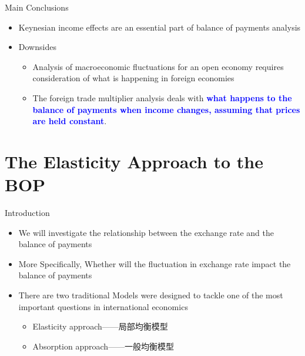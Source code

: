 \documentclass[10pt,hyperref={CJKbookmarks=true},xcolor=dvipsnames,aspectratio=169]{beamer}
\begin{document}
\begin{frame}{Main Conclusions}

\begin{itemize}
\item Keynesian income effects are an essential part of balance of payments
analysis
\item Downsides

\begin{itemize}
\item Analysis of macroeconomic fluctuations for an open economy requires
consideration of what is happening in foreign economies
\item The foreign trade multiplier analysis deals with \textbf{\textcolor{blue}{what
happens to the balance of payments when income changes, assuming that
prices are held constant}}.
\end{itemize}
\end{itemize}
\end{frame}



\section{The Elasticity Approach to the BOP}
\begin{frame}{Introduction}

\begin{itemize}
\item We will investigate the relationship between the exchange rate and
the balance of payments
\item More Specifically, Whether will the fluctuation in exchange rate impact
the balance of payments
\item There are two traditional Models were designed to tackle one of the
most important questions in international economics

\begin{itemize}
\item Elasticity approach——局部均衡模型
\item Absorption approach——一般均衡模型
\end{itemize}
\end{itemize}
\end{frame}
\end{document}
